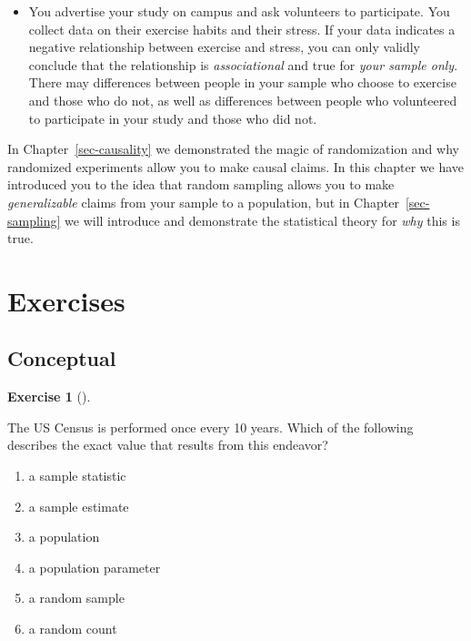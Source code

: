 \documentclass[
  letterpaper,
  DIV=11,
  numbers=noendperiod]{scrreprt}
\providecommand{\tightlist}{%
  \setlength{\itemsep}{0pt}\setlength{\parskip}{0pt}}\usepackage{longtable,booktabs,array}
\theoremstyle{definition}
\newtheorem{exercise}{Exercise}[chapter]
\theoremstyle{remark}
\begin{document}
\begin{itemize}
  \begin{itemize}
  \tightlist
  \item
    You advertise your study on campus and ask volunteers to
    participate. You collect data on their exercise habits and their
    stress. If your data indicates a negative relationship between
    exercise and stress, you can only validly conclude that the
    relationship is \emph{associational} and true for \emph{your sample
    only}. There may differences between people in your sample who
    choose to exercise and those who do not, as well as differences
    between people who volunteered to participate in your study and
    those who did not.
  \end{itemize}
\end{itemize}

In Chapter~\ref{sec-causality} we demonstrated the magic of
randomization and why randomized experiments allow you to make causal
claims. In this chapter we have introduced you to the idea that random
sampling allows you to make \emph{generalizable} claims from your sample
to a population, but in Chapter~\ref{sec-sampling} we will introduce and
demonstrate the statistical theory for \emph{why} this is true.

\hypertarget{sec-ex08}{%
\section{Exercises}\label{sec-ex08}}

\hypertarget{sec-ex08-conceptual}{%
\subsection{Conceptual}\label{sec-ex08-conceptual}}

\begin{exercise}[]\protect\hypertarget{exr-ch08-c01}{}\label{exr-ch08-c01}

The US Census is performed once every 10 years. Which of the following
describes the exact value that results from this endeavor?

\begin{enumerate}
\def\labelenumi{\alph{enumi})}
\tightlist
\item
  a sample statistic
\item
  a sample estimate
\item
  a population
\item
  a population parameter
\item
  a random sample
\item
  a random count
\end{enumerate}

\end{exercise}
\end{document}
